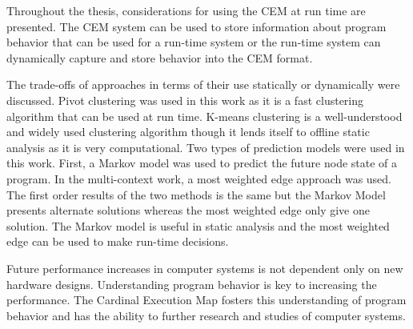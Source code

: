 Throughout the thesis, considerations for using the CEM at run time
are presented. The CEM system can be used to store information about
program behavior that can be used for a run-time system or the run-time
system can dynamically capture and store behavior into the CEM
format.

The trade-offs of approaches in terms of their use statically or dynamically
were discussed. Pivot clustering was used in this work as it is a fast
clustering algorithm that can be used at run time. K-means clustering is a
well-understood and widely used clustering algorithm though it lends itself to
offline static analysis as it is very computational. Two types of prediction
models were used in this work. First, a Markov model was used to predict the
future node state of a program. In the multi-context work, a most weighted edge
approach was used. The first order results of the two methods is the same but
the Markov Model presents alternate solutions whereas the most weighted edge
only give one solution. The Markov model is useful in static analysis and the
most weighted edge can be used to make run-time decisions.

Future performance increases in computer systems is not dependent only
on new hardware designs. Understanding program behavior is key to
increasing the performance. The Cardinal Execution Map fosters this
understanding of program behavior and has the ability to further
research and studies of computer systems.
